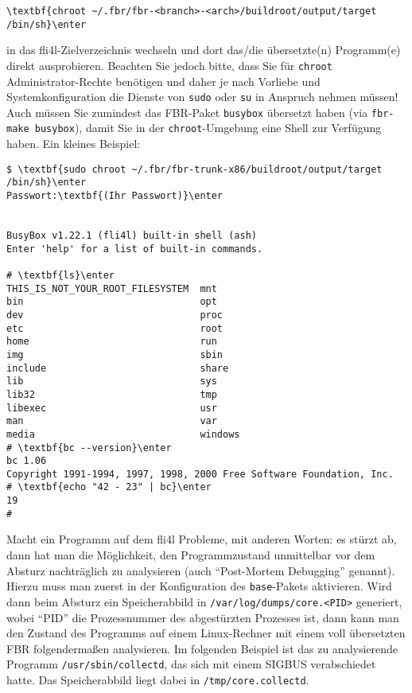 \begin{example}
\begin{Verbatim}[commandchars=\\\{\}]
\textbf{chroot ~/.fbr/fbr-<branch>-<arch>/buildroot/output/target /bin/sh}\enter
\end{Verbatim}
\end{example}

\noindent in das fli4l-Zielverzeichnis wechseln und dort das/die
übersetzte(n) Programm(e) direkt ausprobieren. Beachten Sie jedoch bitte, dass
Sie für \texttt{chroot} Administrator-Rechte benötigen und daher je nach
Vorliebe und Systemkonfiguration die Dienste von \texttt{sudo} oder \texttt{su}
in Anspruch nehmen müssen! Auch müssen Sie zumindest das FBR-Paket
\texttt{busybox} übersetzt haben (via \texttt{fbr-make busybox}), damit Sie in
der \texttt{chroot}-Umgebung eine Shell zur Verfügung haben. Ein kleines
Beispiel:

\begin{example}
\begin{Verbatim}[commandchars=\\\{\}]
$ \textbf{sudo chroot ~/.fbr/fbr-trunk-x86/buildroot/output/target /bin/sh}\enter
Passwort:\textbf{(Ihr Passwort)}\enter


BusyBox v1.22.1 (fli4l) built-in shell (ash)
Enter 'help' for a list of built-in commands.

# \textbf{ls}\enter
THIS_IS_NOT_YOUR_ROOT_FILESYSTEM  mnt
bin                               opt
dev                               proc
etc                               root
home                              run
img                               sbin
include                           share
lib                               sys
lib32                             tmp
libexec                           usr
man                               var
media                             windows
# \textbf{bc --version}\enter
bc 1.06
Copyright 1991-1994, 1997, 1998, 2000 Free Software Foundation, Inc.
# \textbf{echo "42 - 23" | bc}\enter
19
#
\end{Verbatim}
\end{example}


Macht ein Programm auf dem fli4l Probleme, mit anderen Worten: es stürzt ab,
dann hat man die Möglichkeit, den Programmzustand unmittelbar vor dem Absturz
nachträglich zu analysieren (auch ``Post-Mortem Debugging'' genannt). Hierzu
muss man zuerst in der Konfiguration des \texttt{base}-Pakets
 aktivieren. Wird dann beim Absturz ein
Speicherabbild in \texttt{/var/log/dumps/core.<PID>} generiert, wobei ``PID''
die Prozessnummer des abgestürzten Prozesses ist, dann kann man den Zustand des
Programms auf einem Linux-Rechner mit einem voll übersetzten FBR folgendermaßen
analysieren. Im folgenden Beispiel ist das zu analysierende Programm
\texttt{/usr/sbin/collectd}, das sich mit einem SIGBUS verabschiedet hatte. Das
Speicherabbild liegt dabei in \texttt{/tmp/core.collectd}.

